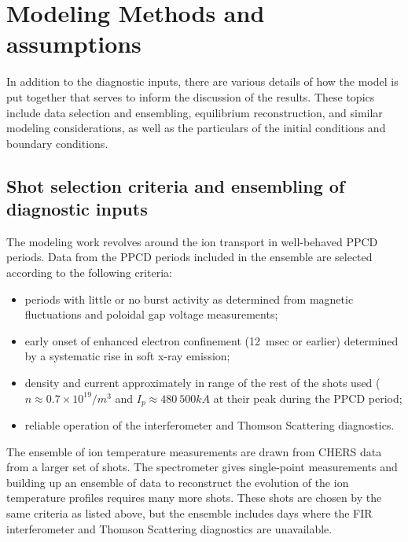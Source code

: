 \section{Modeling Methods and assumptions}
In addition to the diagnostic inputs, there are various details of how the model is put together that serves to inform the discussion of the results. These topics include data selection and ensembling, equilibrium reconstruction, and similar modeling considerations, as well as the particulars of the initial conditions and boundary conditions. 

\subsection{Shot selection criteria and ensembling of diagnostic inputs}

The modeling work revolves around the ion transport in well-behaved PPCD periods. Data from the PPCD periods included in the ensemble are selected according to the following criteria:
\begin{itemize}
\item periods with little or no burst activity as determined from magnetic fluctuations and poloidal gap voltage measurements; 
\item early onset of enhanced electron confinement (12~msec or earlier) determined by a systematic rise in soft x-ray emission;
\item density and current approximately in range of the rest of the shots used ($n \approx 0.7 \times 10^{19} /m^3$ and $I_p \approx 480 ~ 500kA $ at their peak during the PPCD period;
\item reliable operation of the interferometer and Thomson Scattering diagnostics.
\end{itemize}
The ensemble of ion temperature measurements are drawn from CHERS data from a larger set of shots. The spectrometer gives single-point measurements and building up an ensemble of data to reconstruct the evolution of the ion temperature profiles requires many more shots. These shots are chosen by the same criteria as listed above, but the ensemble includes days where the FIR interferometer and Thomson Scattering diagnostics are unavailable.





